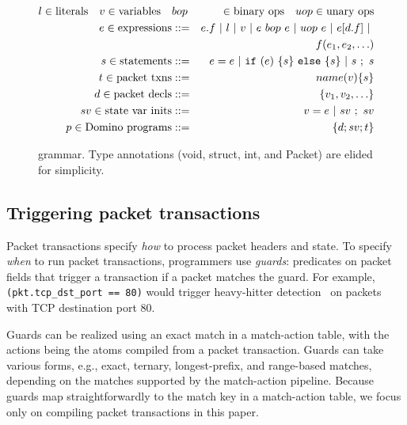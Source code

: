 \begin{figure}
\newcommand{\sep}{~|~}
\begin{scriptsize}
\begin{eqnarray*}
l \in \text{literals} \quad v \in \text{variables} \quad &bop& \in \text{binary ops} \quad
uop \in \text{unary ops} \\
%
e \in \text{expressions} &::=& e.f \sep l \sep v \sep e~bop~e \sep uop~e \sep e[d.f] \sep \\
                   & &   f(e_1, e_2, \ldots) \\
%
s \in \text{statements} &::=& e = e \sep {\tt if}~(e)~\{ s \}~{\tt else}~ \{ s \} \sep s~;~s \\
%
t \in \text{packet txns} &::=& name(v) \{ s \} \\
%
%
d \in \text{packet decls} &::=& \{ v_1, v_2, \ldots \} \\
%
sv \in \text{state var inits} &::=& v = e \sep sv~;~sv \\
%
p \in \text{\pktlanguage programs} &::=& \{ d ; sv; t \}
\end{eqnarray*}
\end{scriptsize}
\caption{\pktlanguage grammar. Type annotations (void, struct, int, and Packet) are elided for simplicity.}
\label{fig:grammar}
\end{figure}


\subsection{Triggering packet transactions}
\label{ss:guards}
Packet transactions specify \textit{how} to process packet headers and state.  To
specify {\em when} to run packet transactions, programmers use {\em guards}:
predicates on packet fields that trigger a transaction if a packet
matches the guard. For example, {\tt (pkt.tcp\_dst\_port == 80)} would
trigger heavy-hitter detection~\cite{opensketch} on packets with TCP
destination port 80.

Guards can be realized using an exact match in a match-action table, with the
actions being the atoms compiled from a packet transaction. Guards
can take various forms, e.g., exact, ternary, longest-prefix, and range-based
matches, depending on the matches supported by the match-action
pipeline. Because guards map straightforwardly to the match key in a
match-action table, we focus only on compiling packet transactions in this paper.

